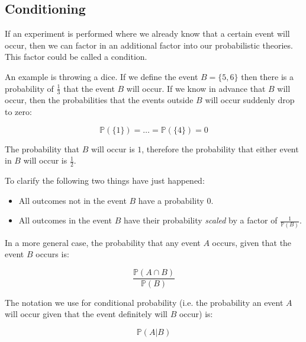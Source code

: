 

\subsection{Conditioning}

If an experiment is performed where we already know that a certain event will
occur, then we can factor in an additional factor into our probabilistic
theories. This factor could be called a condition.

An example is throwing a dice. If we define the event $B = \{5, 6\}$ then there
is a probability of $\frac{1}{3}$ that the event $B$ will occur. If we know in
advance that $B$ will occur, then the probabilities that the events outside $B$
will occur suddenly drop to zero:

\begin{dmath*}
	{\mathbb{P}(\{1\}) = \dots = \mathbb{P}(\{4\}) = 0}
\end{dmath*}

The probability that $B$ will occur is $1$, therefore the probability that
either event in $B$ will occur is $\frac{1}{2}$.

To clarify the following two things have just happened:

\begin{itemize}
	\item All outcomes not in the event $B$ have a probability $0$.
	\item All outcomes in the event $B$ have their probability {\it scaled} by a
	factor of $\frac{1}{\mathbb{P}(B)}$.
\end{itemize}

In a more general case, the probability that any event $A$ occurs, given that
the event $B$ occurs is:

\begin{dmath*}
	\frac{\mathbb{P}(A \cap B)}{\mathbb{P}(B)}
\end{dmath*}

The notation we use for conditional probability (i.e. the probability an event
$A$ will occur given that the event definitely will $B$ occur) is:

\begin{dmath*}
	\mathbb{P}(A|B)
\end{dmath*}



